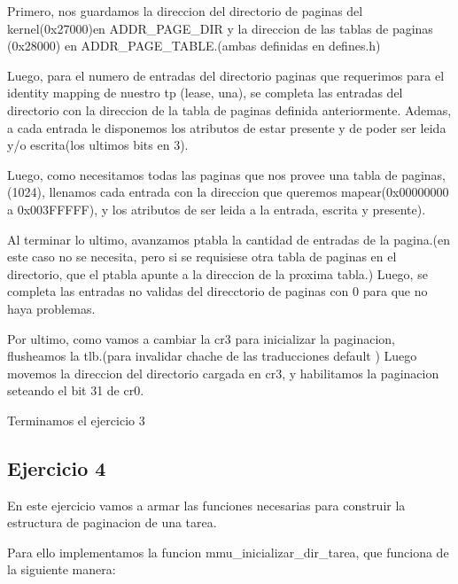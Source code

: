 \documentclass[a4paper]{article}
\begin{document}
	 
	Primero, nos guardamos la direccion del directorio de paginas del kernel(0x27000)en ADDR_PAGE_DIR y la direccion de las tablas de paginas (0x28000) en ADDR_PAGE_TABLE.(ambas definidas en defines.h)
	
	Luego, para el numero de entradas del directorio paginas que requerimos para el identity mapping de nuestro tp (lease, una), se completa las entradas del directorio con la direccion de la tabla de paginas definida anteriormente. 
	Ademas, a cada entrada le disponemos los atributos de estar presente y de poder ser leida y/o escrita(los ultimos bits en 3). 
	
	
	Luego, como necesitamos todas las paginas que nos provee una tabla de paginas,(1024), llenamos cada entrada con la direccion que queremos mapear(0x00000000 a 0x003FFFFF), y  los atributos de ser leida a la entrada, escrita y presente). 

	Al terminar lo ultimo,  avanzamos ptabla la cantidad de entradas de la pagina.(en este caso no se necesita, pero si se requisiese otra tabla de paginas en el directorio, que el ptabla apunte a la direccion de la proxima tabla.) Luego, se completa las entradas no validas del direcctorio de paginas con 0 para que no haya problemas.

	Por ultimo, como vamos a cambiar la cr3 para inicializar la paginacion, flusheamos la tlb.(para invalidar chache de las traducciones default )
	Luego movemos la direccion del directorio cargada en cr3, y habilitamos la paginacion seteando el bit 31 de cr0.

	
	 
	Terminamos el ejercicio 3
\newpage

\subsection{Ejercicio 4}

En este ejercicio vamos a armar  las funciones necesarias para construir la estructura de paginacion de una tarea.

Para ello implementamos la funcion mmu_inicializar_dir_tarea, que funciona de la siguiente manera:
\end{document}
